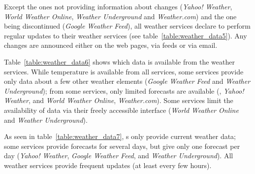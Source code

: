 Except the ones not providing information about changes (\emph{Yahoo! Weather}, \emph{World Weather Online}, \emph{Weather Underground} and \emph{Weather.com}) and the one being discontinued (\emph{Google Weather Feed}), all weather services declare to perform regular updates to their weather services (see table~\ref{table:weather_data5}). Any changes are announced either on the web pages, via  feeds or via email.

Table~\ref{table:weather_data6} shows which data is available from the weather services. While temperature is available from all services, some services provide only data about a few other weather elements (\emph{Google Weather Feed} and \emph{Weather Underground}); from some services, only limited forecasts are available (, \emph{Yahoo! Weather}, and \emph{World Weather Online}, \emph{Weather.com}). Some services limit the availability of data via their freely accessible interface (\emph{World Weather Online} and \emph{Weather Underground}).

As seen in table~\ref{table:weather_data7}, s only provide current weather data; some services provide forecasts for several days, but give only one forecast per day (\emph{Yahoo! Weather}, \emph{Google Weather Feed}, and \emph{Weather Underground}). All weather services provide frequent updates (at least every few hours).

